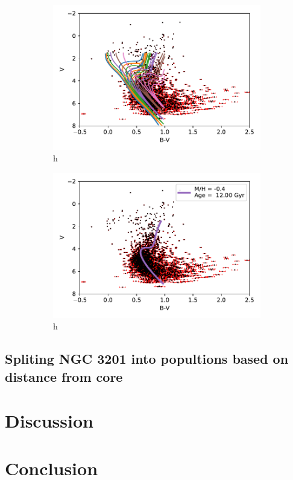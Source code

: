 \documentclass[11pt]{article}
\begin{document}
\begin{figure}
	\centering
	\begin{subfigure}[b]{0.49\textwidth}
		\centering
		\includegraphics[width=\textwidth]{../Figures/manyiso}
		\caption{h}
		\label{fig:isomany}
	\end{subfigure}
	\hfill
	\begin{subfigure}[b]{0.49\textwidth}
		\centering
		\includegraphics[width=\textwidth]{../Figures/singiso}
		\caption{h}
		\label{fig:singiso}
	\end{subfigure}
	\caption{}
	\label{fig:iso}
\end{figure}

\subsection{Spliting NGC 3201 into popultions based on distance from core}

\section{Discussion}

\section{Conclusion}



\end{document}
